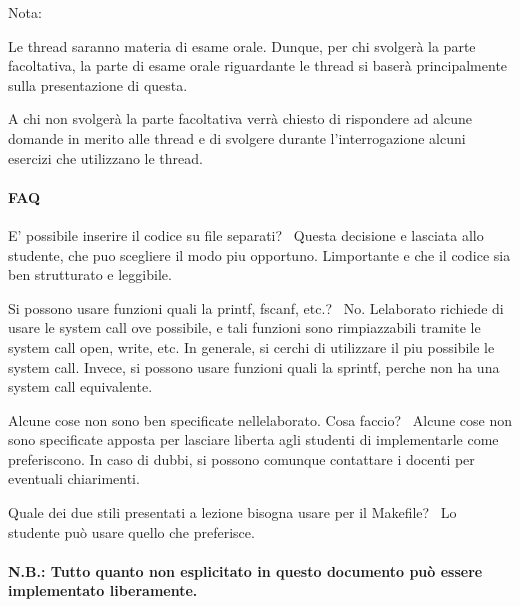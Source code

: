 Nota\+:
\begin{DoxyItemize}
\item Le thread saranno materia di esame orale. Dunque, per chi svolgerà la parte facoltativa, la parte di esame orale riguardante le thread si baserà principalmente sulla presentazione di questa.
\item A chi non svolgerà la parte facoltativa verrà chiesto di rispondere ad alcune domande in merito alle thread e di svolgere durante l’interrogazione alcuni esercizi che utilizzano le thread.
\end{DoxyItemize}

\paragraph*{F\+AQ}


\begin{DoxyEnumerate}
\item E’ possibile inserire il codice su file separati?~\newline
 Questa decisione e\textquotesingle{} lasciata allo studente, che puo\textquotesingle{} scegliere il modo piu\textquotesingle{} opportuno. L\textquotesingle{}importante e\textquotesingle{} che il codice sia ben strutturato e leggibile.
\item Si possono usare funzioni quali la printf, fscanf, etc.?~\newline
 No. L\textquotesingle{}elaborato richiede di usare le system call ove possibile, e tali funzioni sono rimpiazzabili tramite le system call open, write, etc. In generale, si cerchi di utilizzare il piu\textquotesingle{} possibile le system call. Invece, si possono usare funzioni quali la sprintf, perche\textquotesingle{} non ha una system call equivalente.
\item Alcune cose non sono ben specificate nell\textquotesingle{}elaborato. Cosa faccio?~\newline
 Alcune cose non sono specificate apposta per lasciare liberta\textquotesingle{} agli studenti di implementarle come preferiscono. In caso di dubbi, si possono comunque contattare i docenti per eventuali chiarimenti.
\item Quale dei due stili presentati a lezione bisogna usare per il Makefile?~\newline
 Lo studente può usare quello che preferisce.
\end{DoxyEnumerate}

\paragraph*{N.\+B.\+: Tutto quanto non esplicitato in questo documento può essere implementato liberamente.}